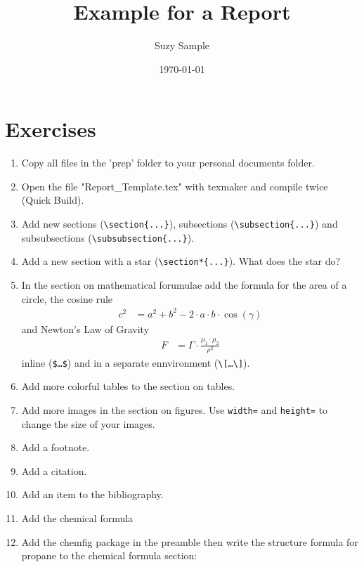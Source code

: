 \documentclass[12pt,a4paper]{article} %
\title{Example for a Report}
\date{\today}
\author{Suzy Sample}
\begin{document}
\section*{Exercises}
\begin{enumerate}
\item Copy all files in the 'prep' folder to your personal documents folder.
\item Open the file "Report\_Template.tex" with texmaker and compile twice (Quick Build).
\item Add new sections (\verb|\section{...}|), subsections (\verb|\subsection{...}|) and subsubsections (\verb|\subsubsection{...}|). 
\item Add a new section with a star (\verb|\section*{...}|). What does the star do?
\item 	In the section on mathematical forumulae add the formula for the area of a circle, the cosine rule 
	\begin{align*}
		c^2 &= a^2 + b^2 - 2 \cdot  a \cdot  b \cdot  \cos (\gamma)
	\end{align*}
	and Newton's Law of Gravity
	\begin{align*}
		F &= \Gamma \cdot  \frac{\mu_1 \cdot  \mu_2}{\rho^2}
	\end{align*}
	inline  (\texttt{\$\dots\$}) and in a separate ennvironment (\texttt{\textbackslash[\ldots\textbackslash]}).
	\item Add more colorful tables to the section on tables.
	\item Add more images in the section on figures. Use \texttt{width=} and \texttt{height=} to change the size of your images.
	\item Add a footnote.
	\item Add a citation.
	\item Add an item to the bibliography.
	\item Add the chemical formula
		\begin{center}
	\end{center}
	\item Add the chemfig package in the preamble then write the structure formula for propane to the chemical formula section:
		\begin{center}
	\end{center}
\end{enumerate}
\end{document}
